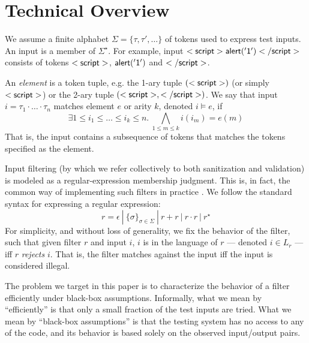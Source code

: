\section{Technical Overview}

We assume a finite alphabet $\Sigma=\{ \tau,\tau',\ldots \}$ of tokens used to express test inputs. An input is a member of $\Sigma^{\star}$. For example, input ${\sf <script>alert('1')</script>}$ consists of tokens ${\sf <script>}$, ${\sf alert('1')}$ and ${\sf </script>}$.

An \emph{element} is a token tuple, e.g. the 1-ary tuple ${\sf (<script>)}$ (or simply ${\sf <script>}$) or the 2-ary tuple ${\sf (<script>,</script>)}$. We say that input $i=\tau_1 \cdot \ldots \cdot \tau_n$ matches element $e$ or arity $k$, denoted $i \models e$, if
$$
\exists 1 \leq i_1 \leq \ldots \leq i_k \leq n.\ \bigwedge_{1 \leq m \leq k}
i(i_m) = e(m)  
$$
That is, the input contains a subsequence of tokens that matches the tokens specified as the element.

Input filtering (by which we refer collectively to both sanitization and validation) is modeled as a regular-expression membership judgment. This is, in fact, the common way of implementing such filters in practice \cite{XXX}. We follow the standard syntax for expressing a regular expression:
$$
	r = \epsilon\ |\ \{ \sigma \}_{\sigma \in \Sigma}\ |\ r + r\ |\ r \cdot r\ |\ r^{\star}
$$
For simplicity, and without loss of generality, we fix the behavior of the filter, such that given filter $r$ and input $i$, $i$ is in the language of $r$ --- denoted $i \in L_r$ --- iff $r$ \emph{rejects} $i$. That is, the filter matches against the input iff the input is considered illegal.

The problem we target in this paper is to characterize the behavior of a filter efficiently under black-box assumptions. Informally, what we mean by ``efficiently'' is that only a small fraction of the test inputs are tried. What we mean by ``black-box assumptions'' is that the testing system has no access to any of the code, and its behavior is based solely on the observed input/output pairs.



